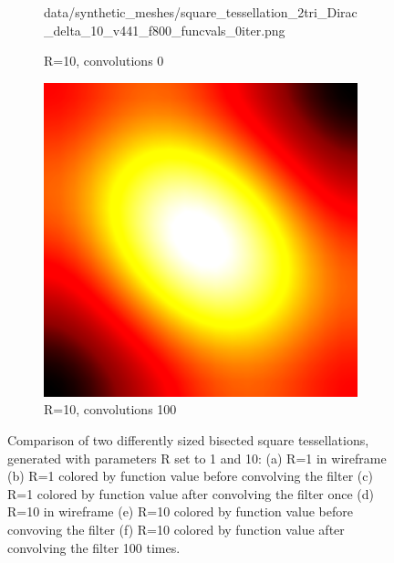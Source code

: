 \begin{figure}[ht]
\begin{subfigure}[b]{0.32\linewidth}
		{data/synthetic_meshes/square_tessellation_2tri_Dirac_delta_10_v441_f800_funcvals_0iter.png}
		\caption{R=10, convolutions 0}\label{fig:sq2.e}
	\end{subfigure}
	\begin{subfigure}[b]{0.32\linewidth}
		\includegraphics[width=\linewidth]
		{data/synthetic_meshes/square_tessellation_2tri_Dirac_delta_10_v441_f800_funcvals_100iter.png}
		\caption{R=10, convolutions 100}\label{fig:sq2.f}
	\end{subfigure}
	\caption[Six views, comparing two differently sized of bisected square tessellations]{Comparison of two differently sized bisected square tessellations, generated with parameters R set to 1 and 10: (a) R=1 in wireframe (b) R=1 colored by function value before convolving the filter (c) R=1 colored by function value after convolving the filter once (d) R=10 in wireframe (e) R=10 colored by function value before convoving the filter (f) R=10 colored by function value after convolving the filter 100 times.}
	\label{fig:sq2}
\end{figure}
